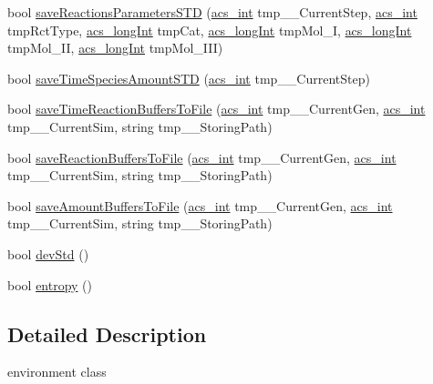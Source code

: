 \begin{DoxyCompactItemize}
\item 
bool \hyperlink{a00013_ae342684050eb7b52144015d258133098}{save\+Reactions\+Parameters\+S\+T\+D} (\hyperlink{a00050_a8d277355641a098190360234e2ebde35}{acs\+\_\+int} tmp\+\_\+\+\_\+\+Current\+Step, \hyperlink{a00050_a8d277355641a098190360234e2ebde35}{acs\+\_\+int} tmp\+Rct\+Type, \hyperlink{a00050_a19319d75f02db4308bc5c0026d98cd85}{acs\+\_\+long\+Int} tmp\+Cat, \hyperlink{a00050_a19319d75f02db4308bc5c0026d98cd85}{acs\+\_\+long\+Int} tmp\+Mol\+\_\+\+I, \hyperlink{a00050_a19319d75f02db4308bc5c0026d98cd85}{acs\+\_\+long\+Int} tmp\+Mol\+\_\+\+I\+I, \hyperlink{a00050_a19319d75f02db4308bc5c0026d98cd85}{acs\+\_\+long\+Int} tmp\+Mol\+\_\+\+I\+I\+I)
\item 
bool \hyperlink{a00013_a65c52d6a1b463c1123bdb62cba9fd088}{save\+Time\+Species\+Amount\+S\+T\+D} (\hyperlink{a00050_a8d277355641a098190360234e2ebde35}{acs\+\_\+int} tmp\+\_\+\+\_\+\+Current\+Step)
\item 
bool \hyperlink{a00013_af36d51ba1965d3f23c879c0d0fb69026}{save\+Time\+Reaction\+Buffers\+To\+File} (\hyperlink{a00050_a8d277355641a098190360234e2ebde35}{acs\+\_\+int} tmp\+\_\+\+\_\+\+Current\+Gen, \hyperlink{a00050_a8d277355641a098190360234e2ebde35}{acs\+\_\+int} tmp\+\_\+\+\_\+\+Current\+Sim, string tmp\+\_\+\+\_\+\+Storing\+Path)
\item 
bool \hyperlink{a00013_ad88fbfd83b7713baf3b528d9a3675540}{save\+Reaction\+Buffers\+To\+File} (\hyperlink{a00050_a8d277355641a098190360234e2ebde35}{acs\+\_\+int} tmp\+\_\+\+\_\+\+Current\+Gen, \hyperlink{a00050_a8d277355641a098190360234e2ebde35}{acs\+\_\+int} tmp\+\_\+\+\_\+\+Current\+Sim, string tmp\+\_\+\+\_\+\+Storing\+Path)
\item 
bool \hyperlink{a00013_a3a7c8819ab4e81a3e2f18d193ba9176f}{save\+Amount\+Buffers\+To\+File} (\hyperlink{a00050_a8d277355641a098190360234e2ebde35}{acs\+\_\+int} tmp\+\_\+\+\_\+\+Current\+Gen, \hyperlink{a00050_a8d277355641a098190360234e2ebde35}{acs\+\_\+int} tmp\+\_\+\+\_\+\+Current\+Sim, string tmp\+\_\+\+\_\+\+Storing\+Path)
\item 
bool \hyperlink{a00013_ae7fd21d14f81c4854b3a6163b0278857}{dev\+Std} ()
\item 
bool \hyperlink{a00013_a4e9b60ec8b05e888cf0e55def03ee906}{entropy} ()
\end{DoxyCompactItemize}


\subsection{Detailed Description}
environment class 

